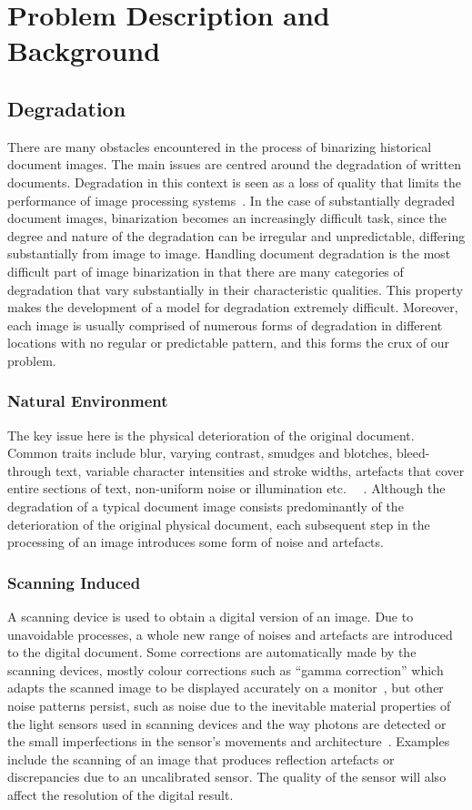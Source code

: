 \documentclass[a4paper, 12pt]{report}
\begin{document}
\section{Problem Description and Background}
\subsection{Degradation}
There are many obstacles encountered in the process of binarizing historical
document images. The main issues are centred around the degradation of written
documents. Degradation in this context is seen as a loss of quality that limits
the performance of image processing systems~\cite{Baird2007}. In the case of
substantially degraded document images, binarization becomes an increasingly
difficult task, since the degree and nature of the degradation can be irregular
and unpredictable, differing substantially from image to image. Handling
document degradation is the most difficult part of image binarization in that
there are many categories of degradation that vary substantially in their
characteristic qualities. This property makes the development of a model for
degradation extremely difficult. Moreover, each image is usually comprised of
numerous forms of degradation in different locations with no regular or
predictable pattern, and this forms the crux of our problem.

\subsubsection{Natural Environment}
The key issue here is the physical deterioration of the original document.
Common traits include blur, varying contrast, smudges and blotches,
bleed-through text, variable character intensities and stroke widths, artefacts
that cover entire sections of text, non-uniform noise or illumination
etc.~\cite{gatos2006adaptive} ~\cite{ait2022innovative}. Although the
degradation of a typical document image consists predominantly of the
deterioration of the original physical document, each subsequent step in the
processing of an image introduces some form of noise and artefacts.

\subsubsection{Scanning Induced}
A scanning device is used to obtain a digital version of an image. Due to
unavoidable processes, a whole new range of noises and artefacts are introduced
to the digital document. Some corrections are automatically made by the
scanning devices, mostly colour corrections such as “gamma correction” which
adapts the scanned image to be displayed accurately on a
monitor~\cite{smoaca2011id}, but other noise patterns persist, such as noise
due to the inevitable material properties of the light sensors used in scanning
devices and the way photons are detected or the small imperfections in the
sensor’s movements and architecture~\cite{smoaca2011id}. Examples include the
scanning of an image that produces reflection artefacts or discrepancies due to
an uncalibrated sensor. The quality of the sensor will also affect the
resolution of the digital result.\par
\end{document}
